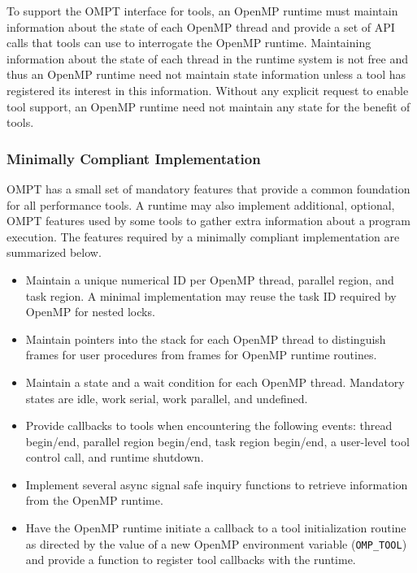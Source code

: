 \documentclass{article}
\begin{document}
To support the OMPT interface for tools, an OpenMP runtime must maintain information about the state of each OpenMP thread and provide a set of API calls that tools can use to interrogate the OpenMP runtime. Maintaining information about the state of each thread in the runtime system is not free and thus an OpenMP runtime need not maintain state information unless a tool has registered its interest in this information.
Without any explicit request to enable tool support, an OpenMP runtime need not maintain any state for the benefit of tools.

\subsubsection{Minimally Compliant Implementation}

OMPT has a small set of mandatory features that provide a common foundation for all performance tools. A runtime may also implement additional, optional, OMPT features used by some tools to gather extra information about a program execution.     
The features required by a minimally compliant implementation are summarized below.

\begin{itemize}
\item Maintain a unique numerical ID per OpenMP thread, parallel region, and task region. A minimal implementation may reuse the task ID required by OpenMP for nested locks.
\item Maintain pointers into the stack for each OpenMP thread to distinguish frames for user procedures from frames for OpenMP runtime routines.  
\item Maintain a state and a wait condition for each OpenMP thread. Mandatory states are idle, work serial, work parallel, and undefined.
\item Provide callbacks to tools when encountering the following  events:  thread begin/end, parallel region begin/end, task region begin/end, a user-level tool control call, and runtime shutdown.
\item Implement several async signal safe inquiry functions to retrieve information from the OpenMP runtime.
\item Have the OpenMP runtime initiate a callback to a tool initialization routine 
as directed by the value of a new OpenMP environment variable (\lstinline|OMP_TOOL|) and provide a function to register tool callbacks with the runtime.
\end{itemize}
\end{document}
